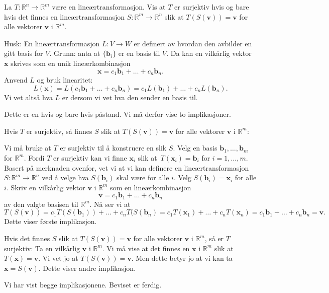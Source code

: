 \documentclass[notitlepage,a4paper,12pt,norsk]{IMFeksamen}
\newcommand{\R}{\mathbb{R}}
\newcommand{\V}[1]{\mathbf{#1}}
\renewcommand{\v}{\V{v}}
\renewcommand{\b}{\V{b}}
\newcommand{\x}{\V{x}}
\newcommand{\0}{\V{0}}
\newcommand{\oppgslutt}{
\begin{center}
\pgfornament[width=6cm]{88}
\end{center}
}
\newenvironment{losning}{\begin{oppgave}}{\oppgslutt\end{oppgave}}
\begin{document}
\begin{losning}
La $T \colon \R^n \to \R^m$ være en lineærtransformasjon.
Vis at $T$ er surjektiv hvis og bare hvis det finnes en
lineærtransformasjon $S \colon \R^m \to \R^n$ slik at
$T(S(\v)) = \v$ for alle vektorer $\v$ i $\R^m$.


Husk: En lineærtransformasjon $L\colon V\rightarrow W$ er definert av hvordan den avbilder en gitt basis for $V$. Grunn: anta at $\{\b_i\}$ er en basis til $V$. Da kan en vilkårlig vektor $\x$ skrives som en unik lineærkombinasjon \[
\x=c_1\b_1+\dots+c_n\b_n.
\]
Anvend $L$ og bruk linearitet:\[
L(\x)=L(c_1\b_1+\dots+c_n\b_n)=c_1L(\b_1)+\dots+c_nL(\b_n).
\]
Vi vet altså hva $L$ er dersom vi vet hva den sender en basis til.


Dette er en hvis og bare hvis påstand. Vi må derfor vise to implikasjoner.

Hvis $T$ er surjektiv, så finnes $S$ slik at $T(S(\v)) = \v$ for alle vektorer $\v$ i $\mathbb{R}^m$:

Vi må bruke at $T$ er surjektiv til å konstruere en slik $S$. Velg en basis $\b_1,\dots,\b_m$ for $\mathbb{R}^m$. Fordi $T$ er surjektiv kan vi finne $\x_i$ slik at~$T(\x_i)=\b_i$ for $i=1,\dots,m$. Basert på merknaden ovenfor, vet vi at vi kan definere en lineærtransformasjon $S\colon \mathbb{R}^m\rightarrow \mathbb{R}^n$ ved å velge hva $S(\b_i)$ skal være for alle $i$. Velg $S(\b_i)=\x_i$ for alle $i$. Skriv en vilkårlig vektor $\v$ i $\mathbb{R}^m$ som en lineærkombinasjon \[
\v=c_1\b_1+\dots+c_n\b_n
\]
av den valgte basisen til $\mathbb{R}^m$. Nå ser vi at 
\[
T(S(\v))=c_1T(S(\b_1))+\dots+c_nT(S(\b_n)=c_1T(\x_1)+\dots+c_nT(\x_n)=c_1\b_1+\dots+c_n\b_n=\v.
\]
Dette viser første implikasjon.

Hvis det finnes $S$ slik at $T(S(\v)) = \v$ for alle vektorer $\v$ i $\mathbb{R}^m$, så er $T$ surjektiv:
Ta en vilkårlig $\v$ i $\mathbb{R}^m$. Vi må vise at det finnes en $\x$ i $\mathbb{R}^m$ slik at $T(\x)=\v$. Vi vet jo at $T(S(\v))=\v$. Men dette betyr jo at vi kan ta $\x=S(\v)$. Dette viser andre implikasjon.

Vi har vist begge implikasjonene. Beviset er ferdig.



\end{losning}
\end{document}
